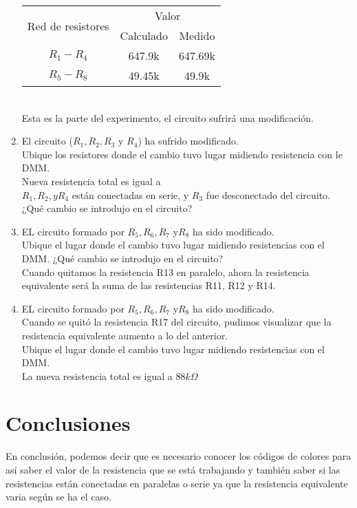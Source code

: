 \begin{enumerate}
\begin{table}[htbp]
		\begin{tabular}{|c|c|c|}
			\hline
			\multirow{2}{*}{Red de resistores} & \multicolumn{2}{c|}{Valor} \\
			\cline{2-3}
			& Calculado & Medido \\
			\hline
			$R_{1} - R_{4}$ &647.9k  & 647.69k \\
			\hline
			$R_{5} - R_{8}$ &49.45k &49.9k \\
			\hline
		\end{tabular}
	\end{table}
	\\ Esta es la parte del experimento, el circuito sufrirá una modificación.
	\item El circuito ($R_{1}, R_{2}, R_{3} $ y $R_{4}$) ha sufrido modificado.
	\\ Ubique los resistores donde el cambio tuvo lugar midiendo resistencia con le DMM.
	\\ Nueva resistencia total es igual a 
	\\$R_{1}, R_{2}, y R_{4}$ están conectadas en serie, y $R_{3}$ fue desconectado del circuito. ¿Qué cambio se introdujo en el circuito?
	\item EL circuito formado por $R_{5}, R_{6}, R_{7}$ y$ R_{8}$ ha sido modificado.
	\\ Ubique el lugar donde el cambio tuvo lugar midiendo resistencias con el DMM. ¿Qué cambio se introdujo en el circuito?
	\\Cuando quitamos la resistencia R13 en paralelo, ahora la resistencia equivalente será la suma de las resistencias R11, R12 y R14.
	\item EL circuito formado por  $R_{5}, R_{6}, R_{7}$ y$ R_{8}$ ha sido modificado. 
	\\ Cuando se quitó la resistencia R17 del circuito, pudimos visualizar que la resistencia equivalente aumento a lo del anterior.
	\\ Ubique el lugar donde el cambio tuvo lugar midiendo resistencias con el DMM. \\ La nueva resistencia total es igual a $88k\Omega$
\end{enumerate}
\section{Conclusiones}
En conclusión, podemos decir que es necesario conocer los códigos de colores para así saber el valor de la resistencia que se está trabajando y también saber si las resistencias están conectadas en paralelas o serie ya que la resistencia equivalente varia según se ha el caso.